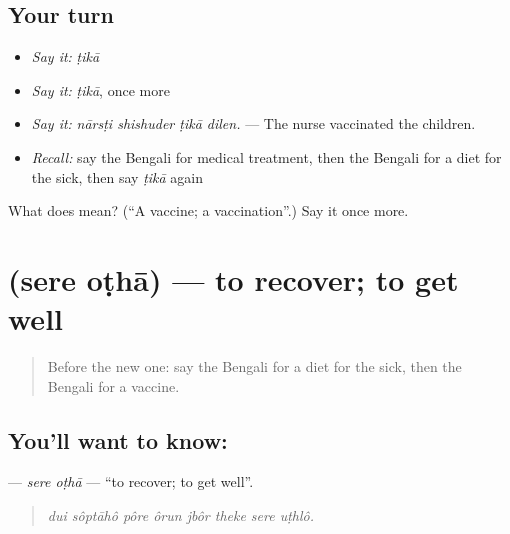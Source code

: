 \subsection*{Your turn}
\begin{itemize}
\raggedright
  \item \emph{Say it:} \emph{ṭikā}
  \item \emph{Say it:} \emph{ṭikā}, once more
  \item \emph{Say it:} \emph{nārsṭi shishuder ṭikā dilen.} — The nurse vaccinated the children.
  \item \emph{Recall:} say the Bengali for medical treatment, then the Bengali for a diet for the sick, then say \emph{ṭikā} again
\end{itemize}

\begin{tcolorbox}[breakable,colback=teal!4,colframe=teal!35!black,title={Before you move on}]
What does  mean? (\textquotedblleft{}A vaccine; a vaccination\textquotedblright{}.) Say it once more.
\end{tcolorbox}
\section[\texorpdfstring{\bn{সেরে} \bn{ওঠা} (sere oṭhā)}{সেরে ওঠা (sere oṭhā)}]{  (sere oṭhā) — to recover; to get well}

\label{lesson:BN-C472-sere-otha}



\begin{quote}
Before the new one: say the Bengali for a diet for the sick, then the Bengali for a vaccine.
\end{quote}

\subsection*{You'll want to know:  }
\textbf{ } — \emph{sere oṭhā} — \textquotedblleft{}to recover; to get well\textquotedblright{}.

\begin{quote}
       
\end{quote}

\begin{quote}
\emph{dui sôptāhô pôre ôrun jbôr theke sere uṭhlô.}
\end{quote}

